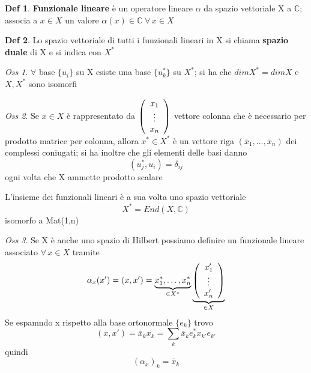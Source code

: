\documentclass[a4paper,11pt]{report}
\theoremstyle{remark}
\newtheorem*{oss}{Oss}
\theoremstyle{definition}
\newtheorem*{Def}{Def}
\newcommand{\C}{\mathbb{C}}
\begin{document}
\begin{Def}
	\textbf{Funzionale lineare} è un operatore lineare $\alpha$ da spazio vettoriale X a $\C$; associa a $x\in X$ un valore $\alpha(x) \in \C \; \forall \, x\in X$
\end{Def}
\begin{Def}
	Lo spazio vettoriale di tutti i funzionali lineari in X si chiama \textbf{spazio duale} di X e si indica con $X^*$
\end{Def}

\begin{oss}
	$\forall$ base $\{u_i\}$ su X esiste una base $\{u^*_k\}$ su $X^*$; si ha che $dim{X^*} = dim {X}$ e $X, X^*$ sono isomorfi
\end{oss}
\begin{oss}
	Se $x \in X$ è rappresentato da $\left(\begin{array}[]{ccc}
		x_1 \\
		\vdots \\
		x_n
	\end{array}\right)$ vettore colonna che è necessario per prodotto matrice per colonna, allora $x^* \in X^*$ è un vettore riga $(\bar{x}_1,\dots, \bar{x}_n)$ dei complessi coniugati; si ha inoltre che gli elementi delle basi danno
	\begin{equation*}
		(u^*_j,u_i) = \delta_{ij}
	\end{equation*}
	ogni volta che X ammette prodotto scalare
\end{oss}

\noindent L'insieme dei funzionali lineari è a sua volta uno spazio vettoriale
\begin{equation*}
	X^* = End (X, \C)
\end{equation*}
isomorfo a Mat(1,n)

\begin{oss}
	Se X è anche uno spazio di Hilbert possiamo definire un funzionale lineare associato $\forall \, x\in X$ tramite 
	\begin{equation*}
		\alpha_x(x') = (x,x') = \underbrace{x^*_1,\dots,x^*_n}_{\in X^*}\underbrace{\left(\begin{array}[]{ccc}
			x'_1 \\
			\vdots \\
			x'_n
		\end{array}\right)}_{\in X}
	\end{equation*}
	Se espamndo x rispetto alla base ortonormale $\{e_k\}$ trovo
	\begin{equation*}
		(x,x') = \bar{x}_kx_k = \sum_k \bar{x}_ke^*_kx_{k'}e_{k'}
	\end{equation*}
	quindi
	\begin{equation*}
		{(\alpha_x)}_k = \bar{x}_k
	\end{equation*}
\end{oss}
\end{document}
